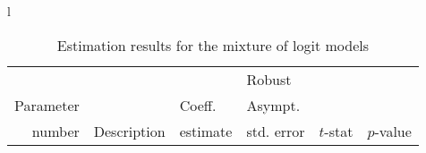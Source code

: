 \documentclass[12pt,a4paper]{article}
\begin{document}
\begin{table}[htb]
\caption{\protect\label{tab:choiceOnly}Estimation results for the mixture of logit
models}
  \begin{tabular}{l}
\begin{tabular}{rlr@{.}lr@{.}lr@{.}lr@{.}l}
         &                       &   \multicolumn{2}{l}{}    & \multicolumn{2}{l}{Robust}  &     \multicolumn{4}{l}{}   \\
Parameter &                       &   \multicolumn{2}{l}{Coeff.}      & \multicolumn{2}{l}{Asympt.}  &     \multicolumn{4}{l}{}   \\
number &  Description                     &   \multicolumn{2}{l}{estimate}      & \multicolumn{2}{l}{std. error}  &   \multicolumn{2}{l}{$t$-stat}  &   \multicolumn{2}{l}{$p$-value}   \\

\hline


\end{tabular}
\end{tabular}
\end{table}
\end{document}
